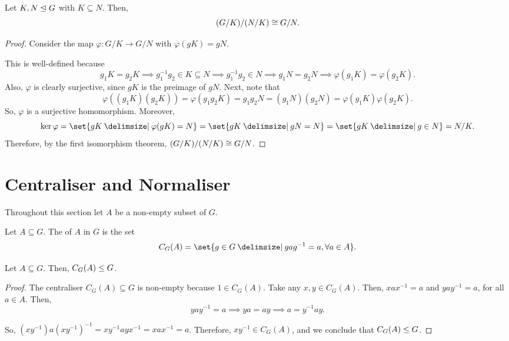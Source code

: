 \documentclass[11pt]{penrose}
\begin{document}
\begin{nthm}
    Let $K, N \mathrel{\trianglelefteq} G$ with $K \subseteq N$. Then,
    \begin{equation*}
        (G/K) / (N/K) \mathrel{\cong} G/N.
    \end{equation*}
\end{nthm}
\begin{proof}
    Consider the map $\varphi : G/K \to G/N$ with $\varphi(gK) = gN$.

    This is well-defined because
    \begin{equation*}
        g_{1}K = g_{2}K
        \implies
        g_{1}^{-1}g_{2} \in K \subseteq N
        \implies
        g_{1}^{-1}g_{2} \in N
        \implies
        g_{1}N = g_{2}N
        \implies
        \varphi(g_{1}K) = \varphi(g_{2}K).
    \end{equation*}
    Also, $\varphi$ is clearly surjective, since $gK$ is the preimage of $gN$. Next, note that
    \begin{equation*}
        \varphi( (g_{1}K)(g_{2}K) )
        = \varphi( g_{1} g_{2} K )
        = g_{1} g_{2} N
        = (g_{1}N) (g_{2}N)
        = \varphi(g_{1}K) \varphi(g_{2}K).
    \end{equation*}
    So, $\varphi$ is a surjective homomorphism. Moreover,
    \begin{equation*}
        \ker\varphi = \set{gK \st \varphi(gK) = N} = \set{gK \st gN = N} = \set{gK \st g \in N} = N/K.
    \end{equation*}
    Therefore, by the first isomorphism theorem, $(G/K) / (N/K) \mathrel{\cong} G/N$.
\end{proof}

\section{Centraliser and Normaliser}

Throughout this section let $A$ be a non-empty subset of $G$.

\begin{ndfn}[Centraliser]
    Let $A \subseteq G$. The  of $A$ in $G$ is the set
    \begin{equation*}
        C_{G}(A) = \set{ g \in G \st g a g^{-1} = a, \forall a \in A }.
    \end{equation*}
\end{ndfn}

\begin{nthm}
    Let $A \subseteq G$. Then, $C_{G}(A) \mathrel{\leq} G$.
\end{nthm}
\begin{proof}
    The centraliser $C_{G}(A) \subseteq G$ is non-empty because $1 \in C_{G}(A)$. Take any $x, y \in C_{G}(A)$. Then, $xax^{-1} = a$ and $yay^{-1} = a$, for all $a \in A$. Then,
    \begin{equation*}
        yay^{-1} = a \implies ya = ay \implies a = y^{-1}ay.
    \end{equation*}

    So, $(xy^{-1}) a (xy^{-1})^{-1} = x y^{-1} a y x^{-1} = x a x^{-1} = a$. Therefore, $xy^{-1} \in C_{G}(A)$, and we conclude that $C_{G}(A) \mathrel{\leq} G$.
\end{proof}
\end{document}
